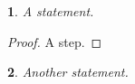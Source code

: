 \documentclass{article}
\newtheorem{thm}{\protect\theoremname}
\newtheorem{prop}[thm]{\protect\propositionname}
\providecommand{\theoremname}{Theorem}
\providecommand{\propositionname}{Proposition}
\begin{document}
\begin{thm}
A statement.
\end{thm}
\begin{proof}
A step.
\end{proof}
\begin{prop}
Another statement.
\end{prop}
\end{document}
